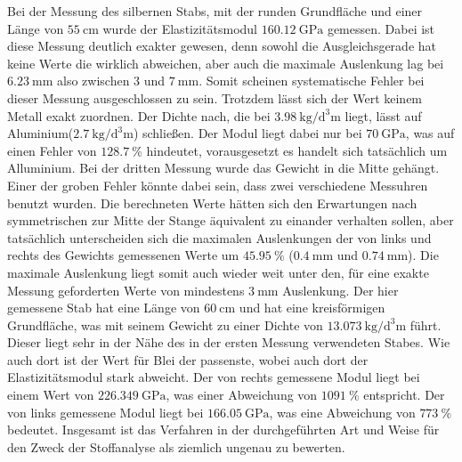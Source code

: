 \noindent Bei der Messung des silbernen Stabs, mit der runden Grundfläche und einer Länge von $\SI{55}{\centi\meter}$ wurde der Elastizitätsmodul $\SI{160,12}{\giga\pascal}$ gemessen. Dabei ist diese Messung deutlich exakter gewesen, denn sowohl die Ausgleichsgerade hat keine Werte die wirklich abweichen, aber auch die maximale Auslenkung lag bei $\SI{6,23}{\milli\meter}$ also zwischen $3$ und $\SI{7}{\milli\meter}$. Somit scheinen systematische Fehler bei dieser Messung ausgeschlossen zu sein. Trotzdem lässt sich der Wert keinem Metall exakt zuordnen. Der Dichte nach, die bei $\SI{3.98}{\kilo\gram\per\cubic\deci\meter}$ liegt, lässt auf Aluminium($\SI{2,7}{\kilo\gram\per\cubic\deci\meter}$) schließen. Der Modul liegt dabei nur bei $\SI{70}{\giga\pascal}$, was auf einen Fehler von $\SI{128,7}{\percent}$ hindeutet, vorausgesetzt es handelt sich tatsächlich um Alluminium.
\noindent Bei der dritten Messung wurde das Gewicht in die Mitte gehängt. Einer der groben Fehler könnte dabei sein, dass zwei verschiedene Messuhren benutzt wurden. Die berechneten Werte hätten sich den Erwartungen nach symmetrischen zur Mitte der Stange äquivalent zu einander verhalten sollen, aber tatsächlich unterscheiden sich die maximalen Auslenkungen der von links und rechts des Gewichts gemessenen Werte um $\SI{45,95}{\percent}$ ($\SI{0,4}{\milli\meter}$ und $\SI{0,74}{\milli\meter}$). 
Die maximale Auslenkung liegt somit auch wieder weit unter den, für eine exakte Messung geforderten Werte von mindestens $\SI{3}{\milli\meter}$ Auslenkung. 
Der hier gemessene Stab hat eine Länge von $\SI{60}{\centi\meter}$ und hat eine kreisförmigen Grundfläche, was mit seinem Gewicht zu einer Dichte von $\SI{13,073}{\kilo\gram\per\cubic\deci\meter}$ führt. Dieser liegt sehr in der Nähe des in der ersten Messung verwendeten Stabes. Wie auch dort ist der Wert für Blei der passenste, wobei auch dort der Elastizitätsmodul stark abweicht. 
Der von rechts gemessene Modul liegt bei einem Wert von $\SI{226,349}{\giga\pascal}$, was einer Abweichung von $\SI{1091}{\percent}$ entspricht. Der von links gemessene Modul liegt bei $\SI{166,05}{\giga\pascal}$, was eine Abweichung von $\SI{773}{\percent}$ bedeutet. 
\noindent Insgesamt ist das Verfahren in der durchgeführten Art und Weise für den Zweck der Stoffanalyse als ziemlich ungenau zu bewerten. 


